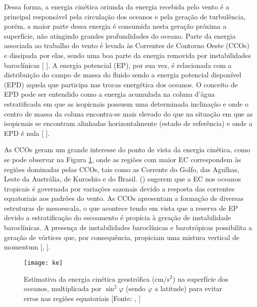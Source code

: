 \documentclass[portuguese,12pt,a4paper]{article}
\begin{document}
Dessa forma, a energia cinética oriunda da energia recebida pelo vento é a principal
responsável pela circulação dos oceanos e pela geração de turbulência, porém, a
maior parte dessa energia é consumida nesta geração próxima a superfície, 
não atingindo grandes profundidades do oceano. Parte da energia associada ao trabalho do vento é
levada às Correntes de Contorno Oeste (CCOs) e dissipada por elas, sendo uma boa
parte da energia removida por instabilidades baroclínicas [ \citeyear{wunsch2004vertical}]. A
energia potencial (EP), por sua vez, é relacionada com a distribuição do campo de
massa do fluido sendo a energia potencial disponível (EPD) aquela que participa nas
trocas energética dos oceanos. O conceito de EPD pode ser entendido como a energia
acumulada na coluna d’água estratificada em que as isopicnais possuem uma
determinada inclinação e onde o centro de massa da coluna encontra-se mais elevado
do que na situação em que as isopicnais se encontram alinhadas horizontalmente
(estado de referência) e onde a EPD é nula [ \citeyear{cushman2011introduction}]. 

As CCOs geram um grande interesse do ponto de vista da energia cinética, como se
pode observar na Figura \ref{fig:ke}, onde as regiões com maior EC correspondem às regiões dominadas pelas CCOs, tais como as Corrente do Golfo, das Agulhas, Leste da Austrália, de Kuroshio e do Brasil.  (\citeyear{ferrari2009ocean}) sugerem que a EC nos oceanos tropicais é governada por variações sazonais devido a resposta das correntes equatoriais aos padrões do vento. As CCOs apresentam a formação de diversas estruturas de mesoescala, o que acontece tendo em vista que a reserva de EP devido a estratificação do escoamento é propícia à geração de instabilidade baroclínicas. A presença de instabilidades baroclínicas e barotrópicas possibilita a geração de vórtices que, por consequência, propiciam uma mistura vertical de momentum [, \citeyear{cushman2011introduction}].


\begin{figure}[H]
	\centering
	\texttt{[image: ke]}
	\caption{Estimativa da energia cinética geostrófica (cm/s$^2$) na superfície dos oceanos, multiplicada por $\sin^2\varphi$ (sendo $\varphi$ a latitude) para evitar erros nas regiões equatoriais [Fonte: , \citeyear{ferrari2009ocean}]}
	\label{fig:ke}
\end{figure}
\end{document}
